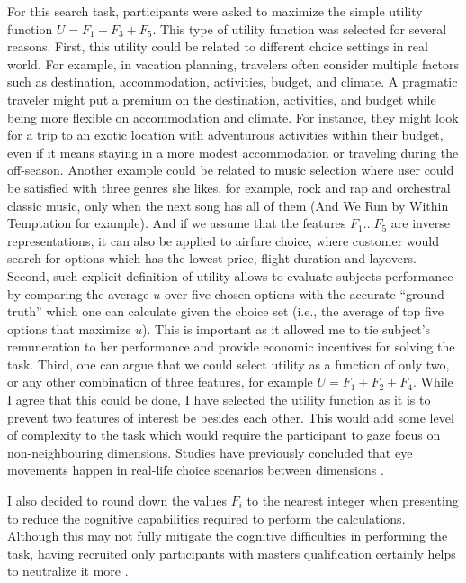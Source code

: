 \documentclass[a4paper,12pt]{article}
\begin{document}
For this search task, participants were asked to maximize the simple utility function  $U = F_1 + F_3 + F_5$. This type of utility function was selected for several reasons. First, this utility could be related to different choice settings in real world. For example, in vacation planning, travelers often consider multiple factors such as destination, accommodation, activities, budget, and climate. A pragmatic traveler might put a premium on the destination, activities, and budget while being more flexible on accommodation and climate. For instance, they might look for a trip to an exotic location with adventurous activities within their budget, even if it means staying in a more modest accommodation or traveling during the off-season. Another example could be related to music selection where user could be satisfied with three genres she likes, for example, rock and rap and orchestral classic music, only when the next song has all of them (And We Run by Within Temptation for example). And if we assume that the features $F_1 \dots F_5$ are inverse representations, it can also be applied to airfare choice, where customer would search for options which has the lowest price, flight duration and layovers.  Second, such explicit definition of utility allows to evaluate subjects performance by comparing the average $u$ over five chosen options with the accurate ``ground truth'' which one can calculate given the choice set (i.e., the average of top five options that maximize $u$). This is important as it allowed me to tie subject's remuneration to her performance and provide economic incentives for solving the task. Third, one can argue that we could select utility as a function of only two, or any other combination of three features, for example $U = F_1 + F_2 + F_4$. While I agree that this could be done, I have selected the utility function as it is to prevent two features of interest be besides each other. This would add some level of complexity to the task which would require the participant to gaze focus on non-neighbouring dimensions. Studies have previously concluded that eye movements happen in real-life choice scenarios between dimensions \citep{noguchi2018multialternative}.

I also decided to round down the values $F_i$ to the nearest integer when presenting to reduce the cognitive capabilities required to perform the calculations. Although this may not fully mitigate the cognitive difficulties in performing the task, having recruited only participants with masters qualification certainly helps to neutralize it more \citep{aguinis2020mturk}.
\end{document}
